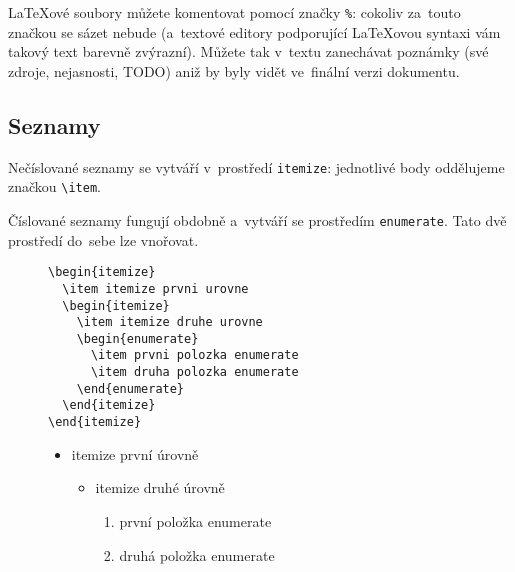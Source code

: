 \LaTeX{}ové soubory můžete komentovat pomocí značky \verb|%|: cokoliv za~touto značkou se sázet nebude (a~textové editory podporující \LaTeX{}ovou syntaxi vám takový text barevně zvýrazní).
Můžete tak v~textu zanechávat poznámky (své zdroje, nejasnosti, TODO) aniž by byly vidět ve~finální verzi dokumentu.

\subsection{Seznamy}

Nečíslované seznamy se vytváří v~prostředí \verb|itemize|:
jednotlivé body oddělujeme značkou \verb|\item|.

Číslované seznamy fungují obdobně a~vytváří se prostředím \verb|enumerate|.
Tato dvě prostředí do~sebe lze vnořovat.

\begin{figure}[ht]
\begin{mdframed}
\onehalfspacing
\begin{verbatim}
\begin{itemize}
  \item itemize prvni urovne
  \begin{itemize}
    \item itemize druhe urovne
    \begin{enumerate}
      \item prvni polozka enumerate
      \item druha polozka enumerate
    \end{enumerate}
  \end{itemize}
\end{itemize}
\end{verbatim}

\vspace*{1em}

\begin{itemize}
    \item itemize první úrovně
    \begin{itemize}
        \item itemize druhé úrovně
        \begin{enumerate}
            \item první položka enumerate
            \item druhá položka enumerate
        \end{enumerate}
    \end{itemize}
\end{itemize}
\end{mdframed}
\end{figure}
\FloatBarrier

